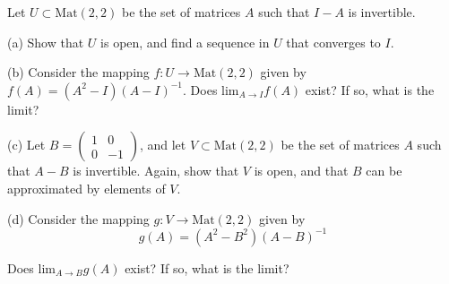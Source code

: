 \begin{exercise}{19}
    Let $U \subset \text{Mat}(2, 2)$ be the set of matrices $A$ such that $I - A$ is invertible.

    (a) Show that $U$ is open, and find a sequence in $U$ that converges to $I$.

    (b) Consider the mapping $f: U \rightarrow \text{Mat}(2,2)$ given by $f(A) = (A^2 - I)(A-I)^{-1}$. Does $\text{lim}_{A\rightarrow I} f(A)$ exist? If so, what is the limit?

    (c) Let $B = \begin{pmatrix}
        1 & 0 \\ 0 & -1
    \end{pmatrix}$, and let $V \subset \text{Mat}(2, 2)$ be the set of matrices $A$ such that $A - B$ is invertible. Again, show that $V$ is open, and that $B$ can be approximated by elements of $V$.

    (d) Consider the mapping $g: V \rightarrow \text{Mat}(2, 2)$ given by 
    $$g(A) = (A^2 - B^2)(A-B)^{-1}$$

    Does $\text{lim}_{A \rightarrow B}g(A)$ exist? If so, what is the limit?
\end{exercise}

